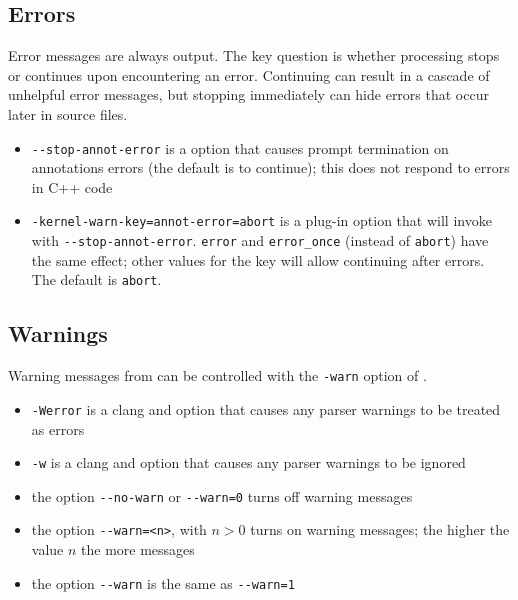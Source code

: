 \subsection{Errors}

Error messages are always output. 
The key question is whether processing stops or continues upon encountering an error. 
Continuing can result in a cascade of unhelpful error messages, but stopping immediately can hide errors that occur later in source files.
\begin{itemize}
\item \lstinline|--stop-annot-error| is a \irg option that causes prompt termination on annotations errors (the \irg default is to continue); this does not respond to errors in C++ code
\item \lstinline|-kernel-warn-key=annot-error=abort| is a \fcl plug-in option that will invoke \irg with \lstinline|--stop-annot-error|.  \lstinline|error| and \lstinline|error_once| (instead of \lstinline|abort|) have the same effect; other values for the key will allow continuing after errors. The default is \texttt{abort}.
\end{itemize}

\subsection{Warnings}


Warning messages from \irg can be controlled with the \lstinline|-warn| option of \irg.

\begin{itemize}
\item \lstinline|-Werror| is a clang and \irg option that causes any parser warnings to be treated as errors
\item \lstinline|-w| is a clang and \irg option that causes any parser warnings to be ignored
\item the \irg option \lstinline|--no-warn| or \lstinline|--warn=0| turns off \irg warning messages
\item the \irg option \lstinline|--warn=<n>|, with $n > 0$ turns on \irg warning messages; the higher the value $n$ the more messages
\item the \irg option \lstinline|--warn| is the same as \lstinline|--warn=1|
\end{itemize}

